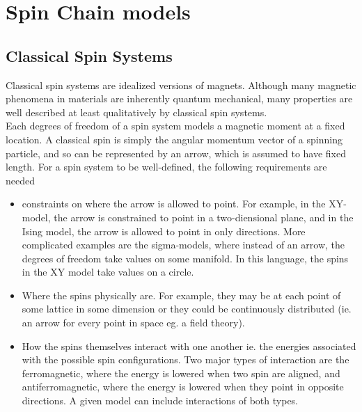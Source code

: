 \documentclass{homework}
\begin{document}
\section{\textbf{Spin Chain models}}

\subsection{Classical Spin Systems}

Classical spin systems are idealized versions of magnets. Although many magnetic phenomena in materials are inherently quantum mechanical, many properties are well described at least qualitatively by classical spin systems. \\

Each degrees of freedom of a spin system models a magnetic moment at a fixed location. A classical spin is simply the angular momentum vector of a spinning particle, and so can be represented by an arrow, which is assumed to have fixed length. For a spin system to be well-defined, the following requirements are needed 

\begin{itemize}
    \item constraints on where the arrow is allowed to point. For example, in the XY-model, the arrow is constrained to point in a two-diensional plane, and in the Ising model, the arrow is allowed to point in only directions. More complicated examples are the sigma-models, where instead of an arrow, the degrees of freedom take values on some manifold. In this language, the spins in the XY model take values on a circle. \\
    \item Where the spins physically are. For example, they may be at each point of some lattice in some dimension or they could be continuously distributed (ie. an arrow for every point in space eg. a field theory). \\
    \item How the spins themselves interact with one another ie. the energies associated with the possible spin configurations. Two major types of interaction are the ferromagnetic, where the energy is lowered when two spin are aligned, and antiferromagnetic, where the energy is lowered when they point in opposite directions. A given model can include interactions of both types. \\
\end{itemize}
\end{document}
